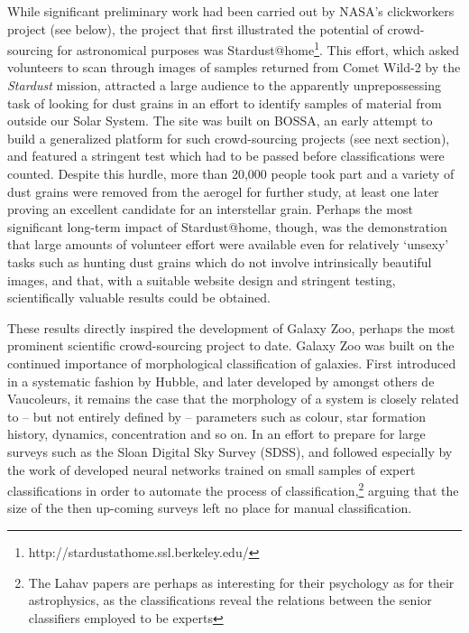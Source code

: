 \documentclass{ar2e}
\begin{document}
While significant preliminary work had been carried out by NASA's clickworkers
project (see below), the project that first illustrated the potential of
crowd-sourcing for astronomical purposes was Stardust@home\footnote{http://stardustathome.ssl.berkeley.edu/}. This effort, which
asked volunteers to scan through images of samples returned from Comet Wild-2
by the \emph{Stardust} mission, attracted a large audience to the apparently
unprepossessing task of looking for dust grains in an effort to identify
samples of material from outside our Solar System. The site was built on
BOSSA, an early attempt to build a generalized platform for such crowd-sourcing
projects (see next section), and featured a stringent test which had to be
passed before classifications were counted. Despite this hurdle, more than
20,000 people took part and a variety of dust grains were removed from the
aerogel for further study, at least one later proving an excellent candidate
for an interstellar grain. Perhaps the most significant long-term impact of
Stardust@home, though, was the demonstration that large amounts of volunteer
effort were available even for relatively `unsexy' tasks such as hunting dust
grains which do not involve intrinsically beautiful images, and that, with a
suitable website design and stringent testing, scientifically valuable results
could be obtained. 


  These results directly inspired
the development of Galaxy Zoo, perhaps the most prominent scientific
crowd-sourcing project to date. Galaxy Zoo was built on the continued
importance of morphological classification of galaxies. First introduced in a
systematic fashion by Hubble, and later developed by amongst others de
Vaucoleurs, it remains the case that the morphology of a system is closely
related to -- but not entirely defined by -- parameters such as colour, star
formation history, dynamics, concentration and so on.  In an effort to prepare
for large surveys such as the Sloan Digital Sky Survey (SDSS),
\citet{Lahav1995} and \citet{Lahav1996} followed especially by the work of
\citet{Ball} developed neural networks trained on small samples of expert
classifications in order to automate the process of
classification,\footnote{The Lahav papers are perhaps as interesting for their
psychology as for their astrophysics, as the classifications reveal the
relations between the senior classifiers employed to be experts} arguing that
the size of the then up-coming surveys left no place for manual
classification.
\end{document}
